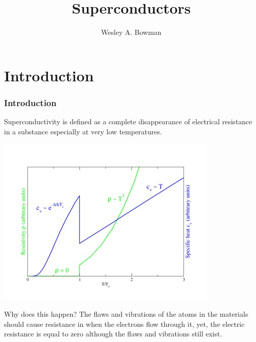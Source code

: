 \documentclass[10pt]{beamer}
\title[Statistical Mechanics Presentation]{Superconductors}
\author[W. Bowman]{\Large Wesley A. Bowman}
\institute{\Large Acadia University \\ \normalsize Physics Department}
\theoremstyle{definition}
\begin{document}
\begin{frame}
    \titlepage
\end{frame}


\section{Introduction}
\begin{frame}
    \frametitle{Introduction}

    Superconductivity is defined as a complete disappearance of electrical
    resistance in a substance especially at very low temperatures.

    \begin{center}
    \includegraphics[scale=0.5]{tcSuperVsNormal.png}
    \end{center}

    Why does this happen?
    The flaws and vibrations of the atoms  in the materials should cause resistance in
    when the electrons flow through it,
    yet, the electric resistance is equal to
    zero although the flaws and vibrations still exist.

\end{frame}
\end{document}
